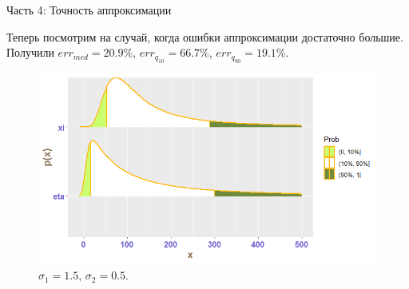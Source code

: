 \documentclass[ucs, notheorems, handout]{beamer}
\begin{document}
	\begin{frame}{Часть 4: Точность аппроксимации}
		
		Теперь посмотрим на случай, когда ошибки аппроксимации достаточно большие. Получили $err_{med} = 20.9\%$,  $err_{q_{10}} = 66.7\%$,  $err_{q_{90}} = 19.1\%$.
		
		\begin{figure}[h]
			\begin{center}
				\begin{minipage}[h]{1\linewidth}
					\includegraphics[width=0.95\linewidth]{img/plot12_n1_new.png}
					\caption{$\sigma_{1} = 1.5$, $\sigma_{2} = 0.5$. } %
					\label{ris7} %
				\end{minipage}
				
			\end{center}
		\end{figure}
	
		
	\end{frame}
	
\end{document}
